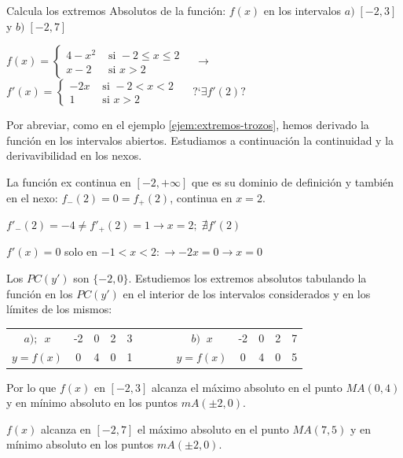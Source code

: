 	\begin{ejem}
		Calcula los extremos Absolutos de la función:  $f(x)$ en los intervalos $a)\; [-2,3]$ y $b)\; [-2,7]$
		
		\noindent $f(x)=\begin{cases}
		4-x^2 & \mbox { si }	 -2 \le x \le 2 \\
		x-2 & \mbox{ si } x>2
	\end{cases} \quad \to$
	$f'(x)=\begin{cases}
	-2x & \mbox { si }	 -2<x<2 \\
	1 & \mbox { si }	 x>2
	\end{cases} \quad \mbox{ ?`}\exists f'(2)?$
	
	Por abreviar, como en el ejemplo \ref{ejem:extremos-trozos}, hemos derivado la función en los intervalos abiertos. Estudiamos a continuación la continuidad y la derivavibilidad en los nexos.
	
	La función ex continua en $[-2,+\infty]$ que es su dominio de definición y también en el nexo: $f_-(2)=0=f_+(2)$, continua en $x=2$.
	
	$f'_-(2)=-4 \neq f'_+(2)=1 \to x=2 ; \; \nexists f'(2)$
	
	$f'(x)=0$ solo en $-1<x<2: \to  -2x=0 \to x=0$
	
	Los $PC(y')$ son $\{-2,0\}$. Estudiemos los extremos absolutos tabulando la función en los $PC(y')$ en el interior de los intervalos considerados y en los límites de los mismos:
	
	\begin{table}[H]
	\centering
	\begin{tabular}{|c|c|c|c|c|c|c|c|c|c|c|}
	\cline{1-5} \cline{7-11}
	 $a);\ \;  x$& -2& 0 & 2 & 3 & $\qquad$ & $b)\; \;  x$ & -2 & 0 & 2  & 7 \\ \cline{1-5} \cline{7-11} 
 	$y=f(x)$& 0 & 4 & 0 & 1 & $\qquad$ &$ y=f(x)$  & 0 & 4 & 0 & 5 \\ \cline{1-5} \cline{7-11} 
	\end{tabular}
	\end{table}
	
	
	Por lo que $f(x)$ en $[-2,3]$ alcanza el máximo absoluto en el punto $MA(0,4)$ y en mínimo absoluto en los puntos $mA(\pm 2,0)$.
	
	$f(x)$ alcanza en $[-2,7]$ el máximo absoluto en el punto $MA(7,5)$ y en mínimo absoluto en los puntos $mA(\pm 2,0)$.

	
	\end{ejem}
	
